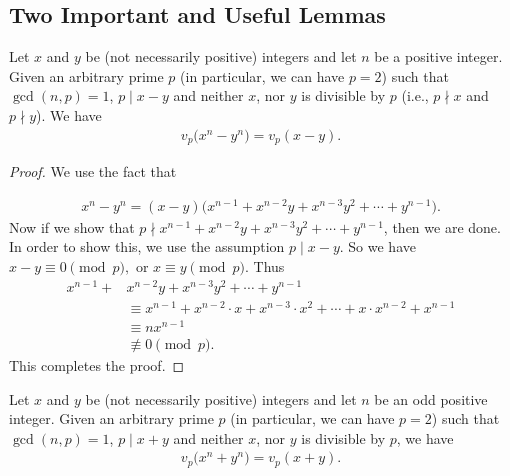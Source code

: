 \documentclass[main.tex]{subfile}
\begin{document}
\subsection{Two Important and Useful Lemmas}

    \begin{lemma}\label{lem:lte-firstlemma}
         Let $x$ and $y$ be (not necessarily positive) integers and let $n$ be a positive integer. Given an arbitrary prime $p$ (in particular, we can have $p=2$) such that $ \gcd(n,p) = 1$, $p \mid  x - y$ and neither $x$, nor $y$ is divisible by $p$ (i.e., $p \nmid x$ and $p \nmid y$).  We have
           \begin{align*}
	            v_p\big(  x^n - y^n \big) = v_p(  x - y ).
           \end{align*}
    \end{lemma}

    \begin{proof}
        We use the fact that
        
        \begin{align*}
        x^n - y^n = (x - y)\big(x^{n - 1} + x^{n - 2}y + x^{n - 3}y^2 + \cdots + y^{n - 1}\big).
        \end{align*}
        Now if we show that $p \nmid x^{n - 1} + x^{n - 2}y + x^{n - 3}y^2 + \cdots + y^{n - 1}$, then we are done.
        In order to show this, we use the assumption $p \mid x-y.$  So we have $x-y \equiv 0 \pmod p,$
        or $x \equiv y \pmod p.$  Thus
        \begin{align*}
        x^{n - 1} + & x^{n - 2}y + x^{n - 3}y^2 + \cdots + y^{n - 1} \\
        & \equiv x^{n-1} +x^{n-2}  \cdot x +x^{n - 3} \cdot x^2 +\cdots +x \cdot x^{n-2} + x^{n-1} \\
        & \equiv n x^{n-1} \\
        & \not\equiv 0 \pmod p.
        \end{align*}
        This completes the proof.
       \end{proof}


    \begin{lemma}\label{secondlemma} 
        Let $ x$ and $y$ be (not necessarily positive) integers and let $n$ be an odd positive integer. Given an arbitrary prime $p$ (in particular, we can have $p=2$) such that $ \gcd(n,p) = 1$, $p\mid x + y$ and neither $x$, nor $y$ is divisible by $p$, we have
        \begin{align*}
	        v_p\big(  x^n + y^n \big) = v_p ( x + y ).
        \end{align*}
    \end{lemma}
\end{document}
